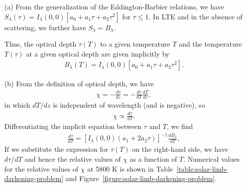\begin{problem}
\begin{enumerate}

\item[(a)]
From the generalization of the Eddington-Barbier relations, we have $S_\lambda(\tau) =
I_\lambda(0,0)[a_0 + a_1\tau + a_2\tau^2]$ for $\tau \le 1$. 
In LTE and in the absence of scattering, we further have $S_\lambda = B_\lambda$.

Thus, the optical depth
$\tau(T)$ to a given temperature $T$ and the temperature $T(\tau)$ at a given optical depth
are given implicitly by
\begin{align}
B_\lambda(T) = I_\lambda(0,0)[a_0 + a_1\tau + a_2\tau^2].
\end{align}
\item[(b)]
From the definition of optical depth, we have \begin{align}
\chi = - \frac{d\tau}{dz} = - \frac{d\tau}{dT}\frac{dT}{dz},
\end{align}
in which $dT/dz$ is independent of wavelength (and is negative), so
\begin{align}
\chi \propto \frac{d\tau}{dT}.
\end{align}
Differentiating the implicit equation between $\tau$ and $T$, we find
\begin{align}
\frac{d\tau}{dT} = \left[I_\lambda(0,0)(a_1 + 2a_2\tau)\right]^{-1}\frac{dB_\lambda}{dT},
\end{align}
If we substitute the expression for $\tau(T)$ on the right-hand side, we have $d\tau/dT$ and hence the relative values of $\chi$ as a function of $T$.
Numerical values for the relative
values of $\chi$ at 5800 K is shown in Table~\ref{table:solar-limb-darkening-problem} and Figure~\ref{figure:solar-limb-darkening-problem}.


\end{enumerate}
\end{problem}
